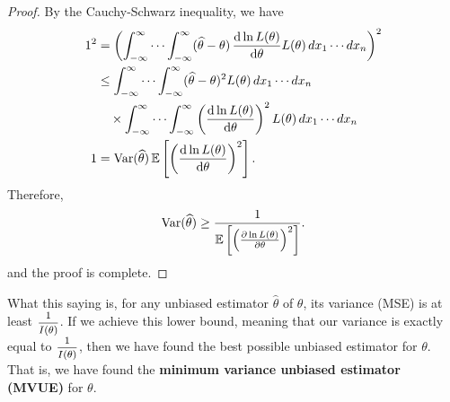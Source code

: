 \begin{proof}
    By the Cauchy-Schwarz inequality, we have
    \begin{align*}
        1^2 &= \left( \int_{-\infty}^{\infty} \cdots \int_{-\infty}^{\infty} (\widehat{\theta} - \theta) \, \odv{\ln L(\theta)}{\theta} L(\theta) \, dx_1 \cdots dx_n \right)^2\\
        &\leq \int_{-\infty}^{\infty} \cdots \int_{-\infty}^{\infty} (\widehat{\theta} - \theta)^2 L(\theta) \, dx_1 \cdots dx_n \\
        &\quad \times \int_{-\infty}^{\infty} \cdots \int_{-\infty}^{\infty} \left( \odv{\ln L(\theta)}{\theta} \right)^2 L(\theta) \, dx_1 \cdots dx_n \\
        1 &= \text{Var}(\widehat{\theta}) \, \mathbb{E} \left[ \left( \odv{\ln L(\theta)}{\theta} \right)^2 \right].
    \end{align*}
    Therefore,
    \[
        \text{Var}(\widehat{\theta}) \geq \frac{1}{\mathbb{E} \left[ \left( \pdv{\ln L(\theta)}{\theta} \right)^2 \right]}.
    \]
    and the proof is complete.
\end{proof}

What this saying is, for any unbiased estimator $\widehat{\theta}$ of $\theta$, its variance 
(MSE) is at least $\mfrac{1}{I(\theta)}$. If we achieve this lower bound, meaning that our 
variance is exactly equal to $\mfrac{1}{I(\theta)}$, then we have found the best possible 
unbiased estimator for $\theta$. That is, we have found the \textbf{minimum variance unbiased estimator (MVUE)} for $\theta$.

